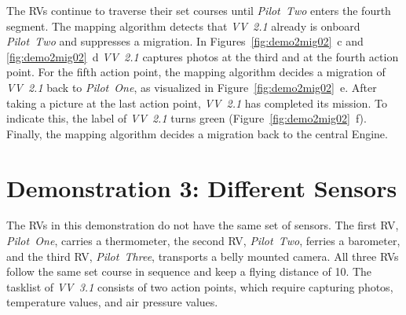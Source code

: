 The \acp{RV} continue to traverse their set courses until \textit{Pilot~Two} enters the fourth segment.
The mapping algorithm detects that \textit{VV~2.1} already is onboard \textit{Pilot~Two} and suppresses
a migration. In Figures~\ref{fig:demo2mig02}~c and \ref{fig:demo2mig02}~d \textit{VV~2.1} captures
photos at the third and at the fourth action point.
%
For the fifth action point, the mapping algorithm decides a migration of \textit{VV~2.1} back to
\textit{Pilot~One}, as visualized in Figure~\ref{fig:demo2mig02}~e. After taking a picture at the last
action point, \textit{VV~2.1} has completed its mission. To indicate this, the label of \textit{VV~2.1}
turns green (Figure~\ref{fig:demo2mig02}~f).
Finally, the mapping algorithm decides a migration back to the central Engine.


\section{Demonstration 3: Different Sensors}
The \acp{RV} in this demonstration do not have the same set of sensors. The first \ac{RV}, \textit{Pilot~One},
carries a thermometer, the second \ac{RV}, \textit{Pilot~Two}, ferries a barometer, and the third \ac{RV},
\textit{Pilot~Three}, transports a belly mounted camera.
All three \acp{RV} follow the same set course in sequence and keep a flying distance of \unit{10}{\second}.
The tasklist of \textit{VV~3.1} consists of two action points, which require capturing photos, temperature
values, and air pressure values.   

